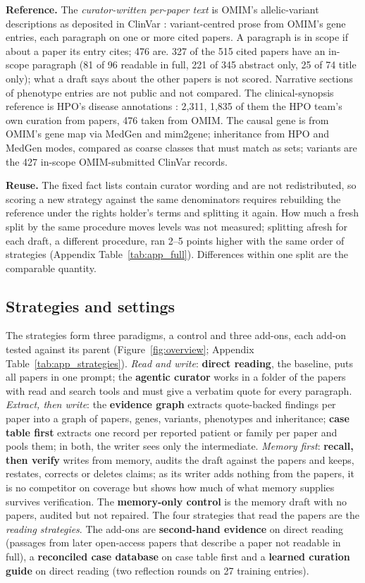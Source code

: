 \documentclass{article} %
\begin{document}
\textbf{Reference.} The \emph{curator-written per-paper text} is OMIM's allelic-variant descriptions as deposited in ClinVar \citep{landrum2025clinvar}: variant-centred prose from OMIM's gene entries, each paragraph on one or more cited papers. A paragraph is in scope if about a paper its entry cites; 476 are. 327 of the 515 cited papers have an in-scope paragraph (81 of 96 readable in full, 221 of 345 abstract only, 25 of 74 title only); what a draft says about the other papers is not scored. Narrative sections of phenotype entries are not public and not compared. The clinical-synopsis reference is HPO's disease annotations \citep{gargano2024human}: 2,311, 1,835 of them the HPO team's own curation from papers, 476 taken from OMIM. The causal gene is from OMIM's gene map via MedGen \citep{Louden2020MedgenNcbis} and mim2gene; inheritance from HPO and MedGen modes, compared as coarse classes that must match as sets; variants are the 427 in-scope OMIM-submitted ClinVar records.

\textbf{Reuse.} The fixed fact lists contain curator wording and are not redistributed, so scoring a new strategy against the same denominators requires rebuilding the reference under the rights holder's terms and splitting it again. How much a fresh split by the same procedure moves levels was not measured; splitting afresh for each draft, a different procedure, ran 2--5 points higher with the same order of strategies (Appendix Table~\ref{tab:app_full}). Differences within one split are the comparable quantity.

\subsection{Strategies and settings}
\label{sec:strategies}
The strategies form three paradigms, a control and three add-ons, each add-on tested against its parent (Figure~\ref{fig:overview}; Appendix Table~\ref{tab:app_strategies}). \emph{Read and write}: \textbf{direct reading}, the baseline, puts all papers in one prompt; the \textbf{agentic curator} works in a folder of the papers with read and search tools and must give a verbatim quote for every paragraph. \emph{Extract, then write}: the \textbf{evidence graph} extracts quote-backed findings per paper into a graph of papers, genes, variants, phenotypes and inheritance; \textbf{case table first} extracts one record per reported patient or family per paper and pools them; in both, the writer sees only the intermediate. \emph{Memory first}: \textbf{recall, then verify} writes from memory, audits the draft against the papers and keeps, restates, corrects or deletes claims; as its writer adds nothing from the papers, it is no competitor on coverage but shows how much of what memory supplies survives verification. The \textbf{memory-only control} is the memory draft with no papers, audited but not repaired. The four strategies that read the papers are the \emph{reading strategies}. The add-ons are \textbf{second-hand evidence} on direct reading (passages from later open-access papers that describe a paper not readable in full), a \textbf{reconciled case database} on case table first and a \textbf{learned curation guide} on direct reading (two reflection rounds on 27 training entries).
\end{document}
